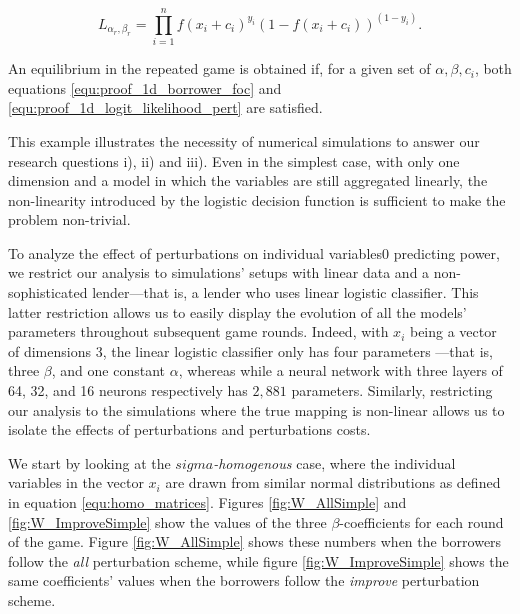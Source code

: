 \documentclass[12pt]{article} %
\begin{document}
\begin{equation} \label{equ:proof_1d_logit_likelihood_pert}
L_{\alpha_r, \beta_r} = 
\prod_{i=1}^n f\left(x_{i}+c_i\right)^{y_{i}}\left(1-f\left(x_{i}+c_i\right)\right)^{\left(1-y_{i}\right)}.
\end{equation}

An equilibrium in the repeated game is obtained if, for a given set of $\alpha, \beta, c_i$, both equations \eqref{equ:proof_1d_borrower_foc} and \eqref{equ:proof_1d_logit_likelihood_pert} are satisfied. 

This example illustrates the necessity of numerical simulations to answer our research questions i), ii) and iii). Even in the simplest case, with only one dimension and a model in which the variables are still aggregated linearly, the non-linearity introduced by the logistic decision function is sufficient to make the problem non-trivial. 

To analyze the effect of perturbations on individual variables0 predicting power, we restrict our analysis to simulations' setups with linear data and a non-sophisticated lender---that is, a lender who uses linear logistic classifier. This latter restriction allows us to easily display the evolution of all the models' parameters throughout subsequent game rounds. Indeed, with $x_i$ being a vector of dimensions 3, the linear logistic classifier only has four parameters ---that is, three $\beta$, and one constant $\alpha$, whereas while a neural network with three layers of 64, 32, and 16 neurons respectively has  $2,881$ parameters. Similarly, restricting our analysis to the simulations where the true mapping is non-linear allows us to isolate the effects of perturbations and perturbations costs. 

We start by looking at the \textit{$sigma$-homogenous} case, where the individual variables in the vector $x_i$ are drawn from similar normal distributions as defined in equation \eqref{equ:homo_matrices}. Figures \ref{fig:W_AllSimple} and \ref{fig:W_ImproveSimple} show the values of the three $\beta$-coefficients for each round of the game. Figure \ref{fig:W_AllSimple} shows these numbers when the borrowers follow the \textit{all} perturbation scheme, while figure \ref{fig:W_ImproveSimple} shows the same coefficients' values when the borrowers follow the \textit{improve} perturbation scheme. 
\end{document}
